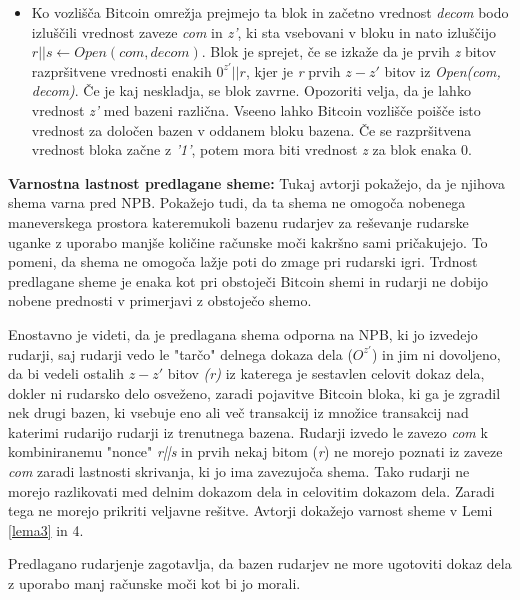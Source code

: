 \documentclass{acm_proc_article-sp}
\begin{document}
\begin{itemize}
	\item Ko vozlišča Bitcoin omrežja prejmejo ta blok in začetno vrednost \textit{decom} bodo izluščili vrednost zaveze \textit{com} in \textit{z'}, ki sta vsebovani v bloku in nato izluščijo \textit{$ r||s \leftarrow Open(com,decom)$}. Blok je sprejet, če se izkaže da je prvih \textit{z} bitov razpršitvene vrednosti enakih $0^{z'}||r$, kjer je \textit{r} prvih \textit{$z-z'$} bitov iz \textit{Open(com, decom)}. Če je kaj neskladja, se blok zavrne. Opozoriti velja, da je lahko vrednost \textit{z'} med bazeni različna. Vseeno lahko Bitcoin vozlišče poišče isto vrednost za določen bazen v oddanem bloku bazena. Če se razpršitvena vrednost bloka začne z \textit{'1'}, potem mora biti vrednost \textit{z} za blok enaka 0.
\end{itemize}

\noindent\textbf{Varnostna lastnost predlagane sheme:} Tukaj avtorji \cite{originalarticle} pokažejo, da je njihova shema varna pred NPB. Pokažejo tudi, da ta shema ne omogoča nobenega maneverskega prostora kateremukoli bazenu rudarjev za reševanje rudarske uganke z uporabo manjše količine računske moči kakršno sami pričakujejo. To pomeni, da shema ne omogoča lažje poti do zmage pri rudarski igri. Trdnost predlagane sheme je enaka kot pri obstoječi Bitcoin shemi in rudarji ne dobijo nobene prednosti v primerjavi z obstoječo shemo.

Enostavno je videti, da je predlagana shema odporna na NPB, ki jo izvedejo rudarji, saj rudarji vedo le "tarčo" delnega dokaza dela ($O^{z'}$) in jim ni dovoljeno, da bi vedeli ostalih $z-z'$ bitov \textit{(r)} iz katerega je sestavlen celovit dokaz dela, dokler ni rudarsko delo osveženo, zaradi pojavitve Bitcoin bloka, ki ga je zgradil nek drugi bazen, ki vsebuje eno ali več transakcij iz množice transakcij nad katerimi rudarijo rudarji iz trenutnega bazena. Rudarji izvedo le zavezo \textit{com} k kombiniranemu "nonce" \textit{r||s} in prvih nekaj bitom (\textit{r}) ne morejo poznati iz zaveze \textit{com} zaradi lastnosti skrivanja, ki jo ima zavezujoča shema. Tako rudarji ne morejo razlikovati med delnim dokazom dela in celovitim dokazom dela. Zaradi tega ne morejo prikriti veljavne rešitve. Avtorji dokažejo varnost sheme v  Lemi \ref{lema3} in 4.

\begin{lema}\label{lema3}
	Predlagano rudarjenje zagotavlja, da bazen rudarjev ne more ugotoviti dokaz dela z uporabo manj računske moči kot bi jo morali.
\end{lema}
\end{document}
